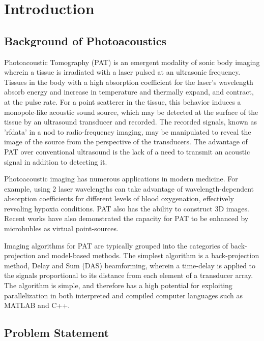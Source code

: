 \chapter{Introduction} 
\label{chapter1:introduction}
\graphicspath{{Chapter-1/graphics/}}

\section{Background of Photoacoustics}
\label{chapter1:backg_photoacoustics}

Photoacoustic Tomography (PAT) is an emergent modality of sonic body imaging wherein a tissue is irradiated with a laser pulsed at an ultrasonic frequency. Tissues in the body with a high absorption coefficient for the laser's wavelength absorb energy and increase in temperature and thermally expand, and contract, at the pulse rate. For a point scatterer in the tissue, this behavior induces a monopole-like acoustic sound source, which may be detected at the surface of the tissue by an ultrasound transducer and recorded. The recorded signals, known as 'rfdata' in a nod to radio-frequency imaging, may be manipulated to reveal the image of the source from the perspective of the transducers. The advantage of PAT over conventional ultrasound is the lack of a need to transmit an acoustic signal in addition to detecting it.

Photoacoustic imaging has numerous applications in modern medicine. For example, using 2 laser wavelengths can take advantage of wavelength-dependent absorption coefficients for different levels of blood oxygenation, effectively revealing hypoxia conditions. PAT also has the ability to construct 3D images. Recent works have also demonstrated the capacity for PAT to be enhanced by microbubles as virtual point-sources.

Imaging algorithms for PAT are typically grouped into the categories of back-projection and model-based methods. The simplest algorithm is a back-projection method, Delay and Sum (DAS) beamforming, wherein a time-delay is applied to the signals proportional to its distance from each element of a transducer array. The algorithm is simple, and therefore has a high potential for exploiting parallelization in both interpreted and compiled computer languages such as MATLAB and C++.

\section{Problem Statement}
\label{chapter1:problem_statement}

